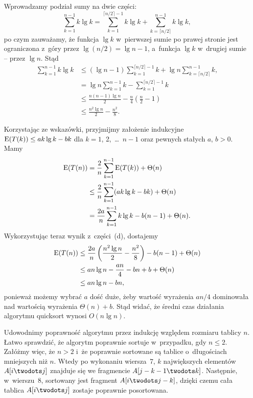 \subproblem %
Wprowadzamy podział sumy na dwie części:
\[
	\sum_{k=1}^{n-1}k\lg k = \sum_{k=1}^{\lceil n/2\rceil-1}k\lg k+\sum_{k=\lceil n/2\rceil}^{n-1}k\lg k,
\]
po czym zauważamy, że funkcja $\lg k$ w~pierwszej sumie po prawej stronie jest ograniczona z~góry przez $\lg(n/2)=\lg n-1$, a~funkcja $\lg k$ w~drugiej sumie -- przez $\lg n$. Stąd
\begin{align*}
	\sum_{k=1}^{n-1}k\lg k &\le (\lg n-1)\sum_{k=1}^{\lceil n/2\rceil-1}k+\lg n\sum_{k=\lceil n/2\rceil}^{n-1}k, \\
	&= \lg n\sum_{k=1}^{n-1}k-\sum_{k=1}^{\lceil n/2\rceil-1}k \\[2mm]
	&\le \frac{n(n-1)\lg n}{2}-\frac{n}{4}\left(\frac{n}{2}-1\right) \\[1mm]
	&\le \frac{n^2\lg n}{2}-\frac{n^2}{8}.
\end{align*}

\subproblem %
Korzystając ze wskazówki, przyjmijmy założenie indukcyjne $\operatorname{E}(T(k))\le ak\lg k-bk$ dla $k=1$, 2,~\dots~$n-1$ oraz pewnych stałych $a$, $b>0$. Mamy
\begin{align*}
	\operatorname{E}(T(n)) &= \frac{2}{n}\sum_{k=1}^{n-1}\operatorname{E}(T(k))+\Theta(n) \\
	&\le \frac{2}{n}\sum_{k=1}^{n-1}(ak\lg k-bk)+\Theta(n) \\
	&= \frac{2a}{n}\sum_{k=1}^{n-1}k\lg k-b(n-1)+\Theta(n).
\end{align*}
Wykorzystując teraz wynik z~części~(d), dostajemy
\begin{align*}
	\operatorname{E}(T(n)) &\le \frac{2a}{n}\left(\frac{n^2\lg n}{2}-\frac{n^2}{8}\right)-b(n-1)+\Theta(n) \\
	&\le an\lg n-\frac{an}{4}-bn+b+\Theta(n) \\
	&\le an\lg n-bn,
\end{align*}
ponieważ możemy wybrać $a$ dość duże, żeby wartość wyrażenia $an/4$ dominowała nad wartością wyrażenia $\Theta(n)+b$. Stąd widać, że średni czas działania algorytmu quicksort wynosi $O(n\lg n)$.


\subproblem %
Udowodnimy poprawność algorytmu przez indukcję względem rozmiaru tablicy $n$. Łatwo sprawdzić, że algorytm poprawnie sortuje w~przypadku, gdy $n\le2$. Załóżmy więc, że $n>2$ i~że poprawnie sortowane są tablice o~długościach mniejszych niż $n$. Wtedy po wykonaniu wiersza~7, $k$ największych elementów $A[i\twodots j]$ znajduje się we fragmencie $A[j-k-1\twodots k]$. Następnie, w~wierszu~8, sortowany jest fragment $A[i\twodots j-k]$, dzięki czemu cała tablica $A[i\twodots j]$ zostaje poprawnie posortowana.

